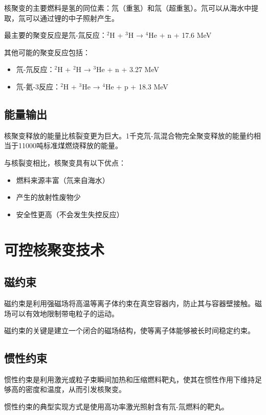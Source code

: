 \documentclass[12pt,UTF8]{ctexbook}
\begin{document}
核聚变的主要燃料是氢的同位素：氘（重氢）和氚（超重氢）。氘可以从海水中提取，氚可以通过锂的中子照射产生。

最主要的聚变反应是氘-氚反应：$^2$H + $^3$H → $^4$He + n + 17.6 MeV

其他可能的聚变反应包括：
\begin{itemize}[leftmargin=2cm]
    \item 氘-氘反应：$^2$H + $^2$H → $^3$He + n + 3.27 MeV
    \item 氘-氦-3反应：$^2$H + $^3$He → $^4$He + p + 18.3 MeV
\end{itemize}

\section{能量输出}

核聚变释放的能量比核裂变更为巨大。1千克氘-氚混合物完全聚变释放的能量约相当于11000吨标准煤燃烧释放的能量。

与核裂变相比，核聚变具有以下优点：
\begin{itemize}[leftmargin=2cm]
    \item 燃料来源丰富（氘来自海水）
    \item 产生的放射性废物少
    \item 安全性更高（不会发生失控反应）
\end{itemize}

\chapter{可控核聚变技术}

\section{磁约束}

磁约束是利用强磁场将高温等离子体约束在真空容器内，防止其与容器壁接触。磁场可以有效地限制带电粒子的运动。

磁约束的关键是建立一个闭合的磁场结构，使等离子体能够被长时间稳定约束。

\section{惯性约束}

惯性约束是利用激光或粒子束瞬间加热和压缩燃料靶丸，使其在惯性作用下维持足够高的密度和温度，从而引发核聚变。

惯性约束的典型实现方式是使用高功率激光照射含有氘-氚燃料的靶丸。
\end{document}
